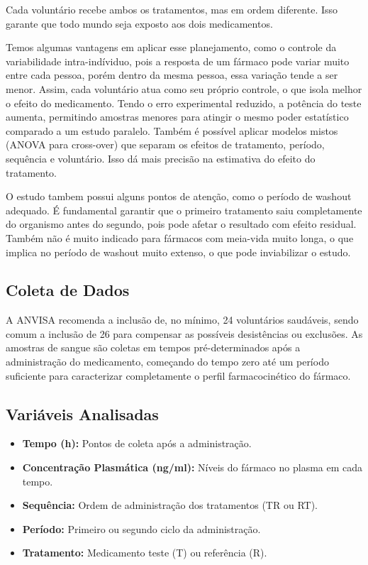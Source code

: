 \documentclass[
]{article}
\providecommand{\tightlist}{%
  \setlength{\itemsep}{0pt}\setlength{\parskip}{0pt}}
\begin{document}
Cada voluntário recebe ambos os tratamentos, mas em ordem diferente.
Isso garante que todo mundo seja exposto aos dois medicamentos.

Temos algumas vantagens em aplicar esse planejamento, como o controle da
variabilidade intra-indíviduo, pois a resposta de um fármaco pode variar
muito entre cada pessoa, porém dentro da mesma pessoa, essa variação
tende a ser menor. Assim, cada voluntário atua como seu próprio
controle, o que isola melhor o efeito do medicamento. Tendo o erro
experimental reduzido, a potência do teste aumenta, permitindo amostras
menores para atingir o mesmo poder estatístico comparado a um estudo
paralelo. Também é possível aplicar modelos mistos (ANOVA para
cross-over) que separam os efeitos de tratamento, período, sequência e
voluntário. Isso dá mais precisão na estimativa do efeito do tratamento.

O estudo tambem possui alguns pontos de atenção, como o período de
washout adequado. É fundamental garantir que o primeiro tratamento saiu
completamente do organismo antes do segundo, pois pode afetar o
resultado com efeito residual. Também não é muito indicado para fármacos
com meia-vida muito longa, o que implica no período de washout muito
extenso, o que pode inviabilizar o estudo.

\hypertarget{coleta-de-dados}{%
\subsection{Coleta de Dados}\label{coleta-de-dados}}

A ANVISA recomenda a inclusão de, no mínimo, 24 voluntários saudáveis,
sendo comum a inclusão de 26 para compensar as possíveis desistências ou
exclusões. As amostras de sangue são coletas em tempos pré-determinados
após a administração do medicamento, começando do tempo zero até um
período suficiente para caracterizar completamente o perfil
farmacocinético do fármaco.

\hypertarget{variuxe1veis-analisadas}{%
\subsection{Variáveis Analisadas}\label{variuxe1veis-analisadas}}

\begin{itemize}
\tightlist
\item
  \textbf{Tempo (h):} Pontos de coleta após a administração.
\item
  \textbf{Concentração Plasmática (ng/ml):} Níveis do fármaco no plasma
  em cada tempo.
\item
  \textbf{Sequência:} Ordem de administração dos tratamentos (TR ou RT).
\item
  \textbf{Período:} Primeiro ou segundo ciclo da administração.
\item
  \textbf{Tratamento:} Medicamento teste (T) ou referência (R).
\end{itemize}
\end{document}
